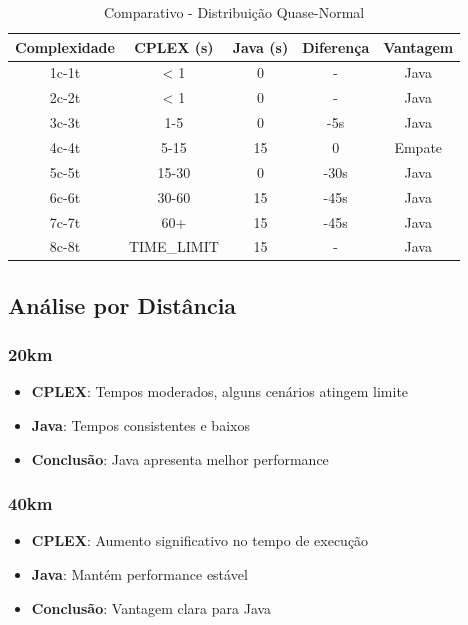 \documentclass[12pt,a4paper]{article}
\begin{document}
\begin{table}[H]
\centering
\caption{Comparativo - Distribuição Quase-Normal}
\begin{tabular}{|c|c|c|c|c|}
\hline
\textbf{Complexidade} & \textbf{CPLEX (s)} & \textbf{Java (s)} & \textbf{Diferença} & \textbf{Vantagem} \\
\hline
1c-1t & < 1 & 0 & - & Java \\
2c-2t & < 1 & 0 & - & Java \\
3c-3t & 1-5 & 0 & -5s & Java \\
4c-4t & 5-15 & 15 & 0 & Empate \\
5c-5t & 15-30 & 0 & -30s & Java \\
6c-6t & 30-60 & 15 & -45s & Java \\
7c-7t & 60+ & 15 & -45s & Java \\
8c-8t & TIME\_LIMIT & 15 & - & Java \\
\hline
\end{tabular}
\end{table}

\subsection{Análise por Distância}

\subsubsection{20km}

\begin{itemize}
    \item \textbf{CPLEX}: Tempos moderados, alguns cenários atingem limite
    \item \textbf{Java}: Tempos consistentes e baixos
    \item \textbf{Conclusão}: Java apresenta melhor performance
\end{itemize}

\subsubsection{40km}

\begin{itemize}
    \item \textbf{CPLEX}: Aumento significativo no tempo de execução
    \item \textbf{Java}: Mantém performance estável
    \item \textbf{Conclusão}: Vantagem clara para Java
\end{itemize}
\end{document}
